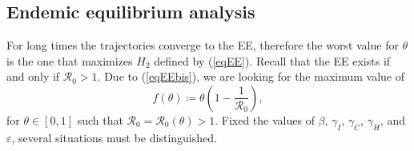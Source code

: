 \documentclass[11pt,reqno]{amsart}
\theoremstyle{boldremark}
\begin{document}
\subsection{Endemic equilibrium analysis} \label{EEanalysis}

\noindent For long times the trajectories converge to the EE, therefore the worst value for $\theta$ is the one that maximizes $H_2$ defined by (\ref{eqEE}). Recall that the EE exists if and only if $\mathcal{R}_0 > 1$. Due to (\ref{eqEEbis}), we are looking for the maximum value of 
\begin{equation} \label{eqftheta}
    f(\theta) \coloneqq \theta \left(1-\frac{1}{\mathcal{R}_0}\right), 
\end{equation}
for $\theta \in [0,1]$ such that $\mathcal{R}_0 = \mathcal{R}_0 (\theta) > 1$. Fixed the values of $\beta$,  $\gamma_I$, $\gamma_C$, $\gamma_H$, and $\varepsilon$, several situations must be distinguished.  
\end{document}
